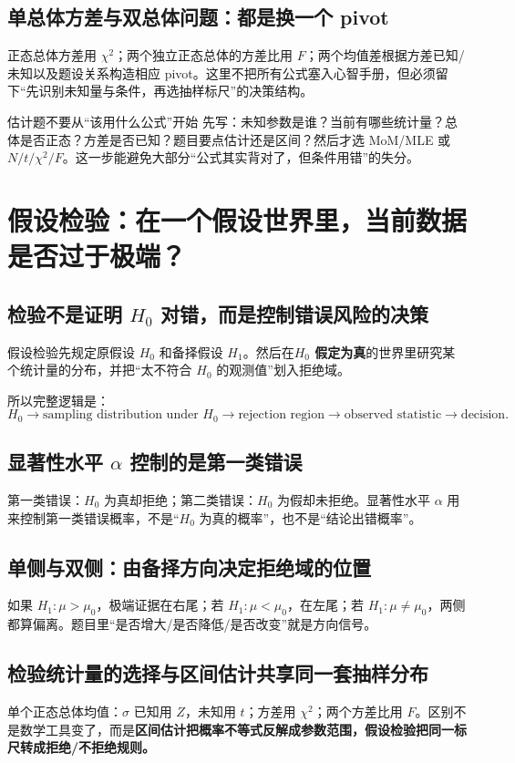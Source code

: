 \documentclass[11pt,a4paper,openany]{ctexbook}
\newcommand{\key}[1]{\textbf{\color{deep}#1}}
\begin{document}
\section{单总体方差与双总体问题：都是换一个 pivot}
正态总体方差用 $\chi^2$；两个独立正态总体的方差比用 $F$；两个均值差根据方差已知/未知以及题设关系构造相应 pivot。这里不把所有公式塞入心智手册，但必须留下“先识别未知量与条件，再选抽样标尺”的决策结构。

\begin{examBox}{估计题不要从“该用什么公式”开始}
先写：未知参数是谁？当前有哪些统计量？总体是否正态？方差是否已知？题目要点估计还是区间？然后才选 MoM/MLE 或 $N/t/\chi^2/F$。这一步能避免大部分“公式其实背对了，但条件用错”的失分。
\end{examBox}

\chapter{假设检验：在一个假设世界里，当前数据是否过于极端？}

\section{检验不是证明 $H_0$ 对错，而是控制错误风险的决策}
假设检验先规定原假设 $H_0$ 和备择假设 $H_1$。然后在\key{$H_0$ 假定为真}的世界里研究某个统计量的分布，并把“太不符合 $H_0$ 的观测值”划入拒绝域。

所以完整逻辑是：
\[
\boxed{H_0\to\text{sampling distribution under }H_0\to\text{rejection region}\to\text{observed statistic}\to\text{decision}.}
\]

\section{显著性水平 $\alpha$ 控制的是第一类错误}
第一类错误：$H_0$ 为真却拒绝；第二类错误：$H_0$ 为假却未拒绝。显著性水平 $\alpha$ 用来控制第一类错误概率，不是“$H_0$ 为真的概率”，也不是“结论出错概率”。

\section{单侧与双侧：由备择方向决定拒绝域的位置}
如果 $H_1:\mu>\mu_0$，极端证据在右尾；若 $H_1:\mu<\mu_0$，在左尾；若 $H_1:\mu\ne\mu_0$，两侧都算偏离。题目里“是否增大/是否降低/是否改变”就是方向信号。

\section{检验统计量的选择与区间估计共享同一套抽样分布}
单个正态总体均值：$\sigma$ 已知用 $Z$，未知用 $t$；方差用 $\chi^2$；两个方差比用 $F$。区别不是数学工具变了，而是\key{区间估计把概率不等式反解成参数范围，假设检验把同一标尺转成拒绝/不拒绝规则。}
\end{document}
